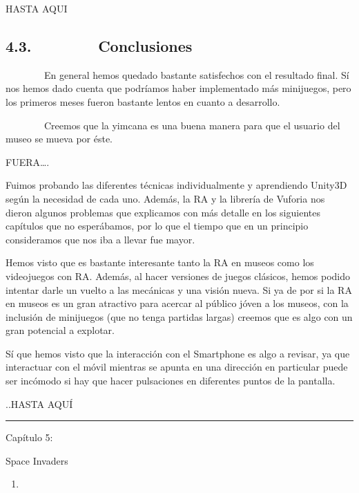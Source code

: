 \documentclass[]{article}
\begin{document}
HASTA AQUI

\subsection{4.3.~~~~~~~~Conclusiones}

~~~~~~~~En general hemos quedado bastante satisfechos con el resultado
final. Sí nos hemos dado cuenta que podríamos haber implementado más
minijuegos, pero los primeros meses fueron bastante lentos en cuanto a
desarrollo.

~~~~~~~~Creemos que la yimcana es una buena manera para que el usuario
del museo se mueva por éste.

FUERA\ldots{}.

Fuimos probando las diferentes técnicas individualmente y aprendiendo
Unity3D según la necesidad de cada uno. Además, la RA y la librería de
Vuforia nos dieron algunos problemas que explicamos con más detalle en
los siguientes capítulos que no esperábamos, por lo que el tiempo que en
un principio consideramos que nos iba a llevar fue mayor.

Hemos visto que es bastante interesante tanto la RA en museos como los
videojuegos con RA. Además, al hacer versiones de juegos clásicos, hemos
podido intentar darle un vuelto a las mecánicas y una visión nueva. Si
ya de por si la RA en museos es un gran atractivo para acercar al
público jóven a los museos, con la inclusión de minijuegos (que no tenga
partidas largas) creemos que es algo con un gran potencial a explotar.

Sí que hemos visto que la interacción con el Smartphone es algo a
revisar, ya que interactuar con el móvil mientras se apunta en una
dirección en particular puede ser incómodo si hay que hacer pulsaciones
en diferentes puntos de la pantalla.

..HASTA AQUÍ

\begin{center}\rule{3in}{0.4pt}\end{center}

Capítulo 5:

Space Invaders

\begin{enumerate}
\item
\end{enumerate}
\end{document}

